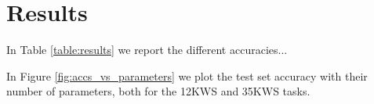 
\section{Results}
\label{sec:results}

In Table \ref{table:results} we report the different accuracies...
%
%
%
%

In Figure \ref{fig:accs_vs_parameters} we plot the test set accuracy with their number of parameters, both for the 12KWS and 35KWS tasks.

